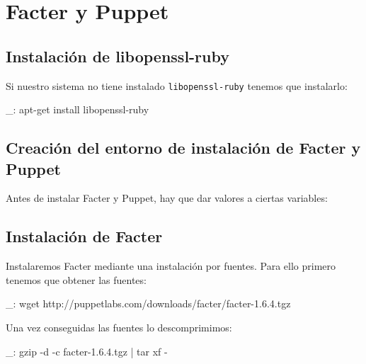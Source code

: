\chapter{Facter y Puppet}
\label{anx:facter-puppet}


\section{Instalación de libopenssl-ruby}

Si nuestro sistema no tiene instalado \texttt{libopenssl-ruby} tenemos que instalarlo:

\begin{bashcode}
_: apt-get install libopenssl-ruby
\end{bashcode}


\section{Creación del entorno de instalación de Facter y Puppet}

Antes de instalar Facter y Puppet, hay que dar valores a ciertas variables:



\section{Instalación de Facter}

Instalaremos Facter mediante una instalación por fuentes. Para ello primero tenemos que obtener las fuentes:

\begin{bashcode}
_: wget http://puppetlabs.com/downloads/facter/facter-1.6.4.tgz
\end{bashcode}

Una vez conseguidas las fuentes lo descomprimimos:

\begin{bashcode}
_: gzip -d -c facter-1.6.4.tgz | tar xf -
\end{bashcode}


